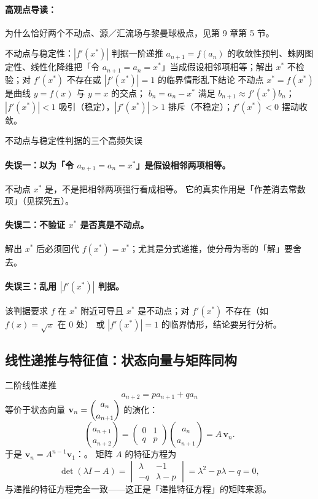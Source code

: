 \begin{explore}
\paragraph{高观点导读：}为什么恰好两个不动点、源／汇流场与黎曼球极点，见第 9 章第 5 节。
\begin{conccard}[二级]{不动点与稳定性：$|f'(x^*)|$ 判据}{一阶递推 $a_{n+1}=f(a_n)$ 的收敛性预判、蛛网图定性、线性化降维}{把「令 $a_{n+1}=a_n=x^*$」当成假设相邻项相等；解出 $x^*$ 不检验；对 $f'(x^*)$ 不存在或 $|f'(x^*)|=1$ 的临界情形乱下结论}
不动点 $x^*=f(x^*)$ 是曲线 $y=f(x)$ 与 $y=x$ 的交点；
$b_n=a_n-x^*$ 满足 $b_{n+1}\approx f'(x^*)b_n$；
$|f'(x^*)|<1$ 吸引（稳定），$|f'(x^*)|>1$ 排斥（不稳定）；$f'(x^*)<0$ 摆动收敛。
\end{conccard}

\begin{commonerror}{不动点与稳定性判据的三个高频失误}
\paragraph{失误一：以为「令 $a_{n+1}=a_n=x^*$」是假设相邻两项相等。}
不动点 $x^*$ 是，不是把相邻两项强行看成相等。
它的真实作用是「作差消去常数项」（见探究五）。
\paragraph{失误二：不验证 $x^*$ 是否真是不动点。}
解出 $x^*$ 后必须回代 $f(x^*)=x^*$；尤其是分式递推，使分母为零的「解」要舍去。
\paragraph{失误三：乱用 $|f'(x^*)|$ 判据。}
该判据要求 $f$ 在 $x^*$ 附近可导且 $x^*$ 是不动点；对 $f'(x^*)$ 不存在（如 $f(x)=\sqrt x$ 在 $0$ 处）
或 $|f'(x^*)|=1$ 的临界情形，结论要另行分析。
\end{commonerror}

\subsection{线性递推与特征值：状态向量与矩阵同构}


二阶线性递推
\[
  a_{n+2}=pa_{n+1}+qa_n
\]
等价于状态向量 $\mathbf v_n=\dbinom{a_n}{a_{n+1}}$ 的演化：
\[
  \binom{a_{n+1}}{a_{n+2}}
  =\begin{pmatrix}0&1\\ q&p\end{pmatrix}\binom{a_n}{a_{n+1}}
  =A\,\mathbf v_n .
\]
于是 $\mathbf v_n=A^{n-1}\mathbf v_1$：。
矩阵 $A$ 的特征方程为
\[
  \det(\lambda I-A)=\begin{vmatrix}\lambda&-1\\-q&\lambda-p\end{vmatrix}
  =\lambda^2-p\lambda-q=0 ,
\]
与递推的特征方程完全一致——这正是「递推特征方程」的矩阵来源。


\end{explore}
